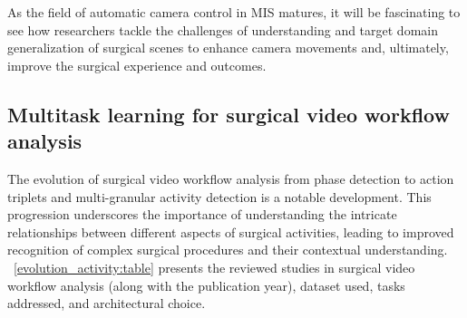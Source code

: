 \documentclass[times,twocolumn,final]{elsarticle}
\newcommand{\tabref}[1]{\tablename~\ref{#1}}
\begin{document}
As the field of automatic camera control in MIS matures, it will be fascinating to see how researchers tackle the challenges of understanding and target domain generalization of surgical scenes to enhance camera movements and, ultimately, improve the surgical experience and outcomes.


\subsection{Multitask learning for  surgical video workflow analysis }

The evolution of  surgical video workflow analysis from phase detection to action triplets and multi-granular activity detection is a notable development. This progression underscores the importance of understanding the intricate relationships between different aspects of surgical activities, leading to improved recognition of complex surgical procedures and their contextual understanding. \tabref{evolution_activity:table} presents the reviewed studies in surgical video workflow analysis (along with the publication year), dataset used, tasks addressed, and architectural choice.
\end{document}

